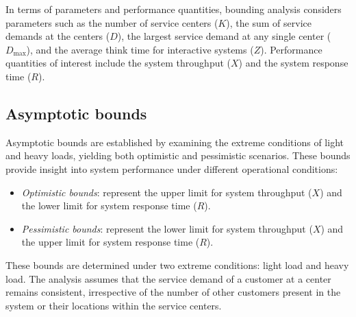 In terms of parameters and performance quantities, bounding analysis considers parameters such as the number of service centers ($K$), the sum of service demands at the centers ($D$), the largest service demand at any single center ($D_{\max}$), and the average think time for interactive systems ($Z$). 
Performance quantities of interest include the system throughput ($X$) and the system response time ($R$).

\subsection{Asymptotic bounds}
Asymptotic bounds are established by examining the extreme conditions of light and heavy loads, yielding both optimistic and pessimistic scenarios. 
These bounds provide insight into system performance under different operational conditions:
\begin{itemize}
    \item \textit{Optimistic bounds}: represent the upper limit for system throughput ($X$) and the lower limit for system response time ($R$).
    \item \textit{Pessimistic bounds}: represent the lower limit for system throughput ($X$) and the upper limit for system response time ($R$).
\end{itemize}
These bounds are determined under two extreme conditions: light load and heavy load. 
The analysis assumes that the service demand of a customer at a center remains consistent, irrespective of the number of other customers present in the system or their locations within the service centers.

